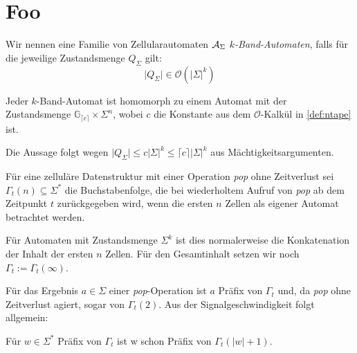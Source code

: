 \documentclass{article}
\begin{document}
\newcommand{\ca}{\ensuremath\mathcal{A}}
\newcommand{\abs}[1]{\lvert#1\rvert}
\newcommand{\ceil}[1]{\lceil#1\rceil}
\newcommand{\zrange}[1]{\mathbb{G}_{#1}}

\section{Foo}

\begin{definition}
    Wir nennen eine Familie von Zellularautomaten $\ca_\Sigma$ \emph{$k$-Band-Automaten}, falls für die jeweilige Zustandsmenge $Q_\Sigma$ gilt:
    \begin{equation}
        \abs{Q_\Sigma} \in \mathcal{O}(\abs{\Sigma}^k) \label{def:ntape}
    \end{equation}
\end{definition}

\begin{satz}
    \label{thm:tape-hom}
    Jeder $k$-Band-Automat ist homomorph zu einem Automat mit der Zustandsmenge $\zrange{\ceil{c}} \times \Sigma^n$, wobei $c$ die Konstante aus dem $\mathcal{O}$-Kalkül in \eqref{def:ntape} ist.

    \begin{beweis}
        Die Aussage folgt wegen $\abs{Q_\Sigma} \leq c \abs{\Sigma}^k \leq \ceil{c} \abs{\Sigma}^k$ aus Mächtigkeitsargumenten.
    \end{beweis}
\end{satz}

\begin{definition}
    Für eine zelluläre Datenstruktur mit einer Operation \emph{pop} ohne Zeitverlust sei $\Gamma_t(n) \subseteq \Sigma^*$ die Buchstabenfolge, die bei wiederholtem Aufruf von \emph{pop} ab dem Zeitpunkt $t$ zurückgegeben wird, wenn die ersten $n$ Zellen als eigener Automat betrachtet werden.

    Für Automaten mit Zustandsmenge $\Sigma^k$ ist dies normalerweise die Konkatenation der Inhalt der ersten $n$ Zellen.
    Für den Gesamtinhalt setzen wir noch $\Gamma_t := \Gamma_t(\infty)$.
\end{definition}

Für das Ergebnis $a \in \Sigma$ einer \emph{pop}-Operation ist $a$ Präfix von $\Gamma_t$ und, da \emph{pop} ohne Zeitverlust agiert, sogar von $\Gamma_t(2)$. Aus der Signalgeschwindigkeit folgt allgemein:
\begin{korollar}
    \label{thm:gamma-in-gamma}
    Für $w \in \Sigma^*$ Präfix von $\Gamma_t$ ist w schon Präfix von $\Gamma_t(\abs{w}+1)$.
\end{korollar}
\end{document}
